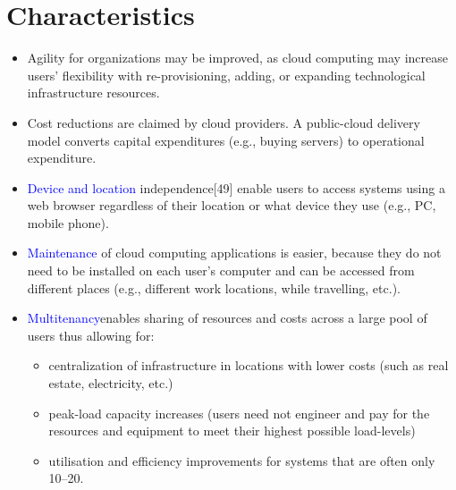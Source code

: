 \documentclass[11pt]{article}
\begin{document}
\section{\color{green}Characteristics}
\begin{itemize}
\item Agility for organizations may be improved, as cloud computing may increase users' flexibility with re-provisioning, adding, or expanding technological infrastructure resources.
\item Cost reductions are claimed by cloud providers. A public-cloud delivery model converts capital expenditures (e.g., buying servers) to operational expenditure.
\item \textcolor{blue}{Device and location} independence[49] enable users to access systems using a web browser regardless of their location or what device they use (e.g., PC, mobile phone).
\item \textcolor{blue}{Maintenance} of cloud computing applications is easier, because they do not need to be installed on each user's computer and can be accessed from different places (e.g., different work locations, while travelling, etc.).
\item \textcolor{blue}{Multitenancy}enables sharing of resources and costs across a large pool of users thus allowing for:
\begin{itemize}
\item centralization of infrastructure in locations with lower costs (such as real estate, electricity, etc.)
\item  peak-load capacity increases (users need not engineer and pay for the resources and equipment to meet their highest possible load-levels)
\item utilisation and efficiency improvements for systems that are often only
 10–20.
\end{itemize}
\end{itemize}
\end{document}

